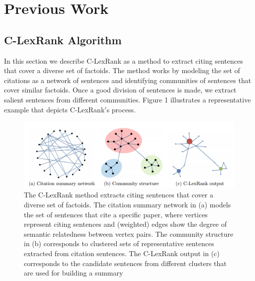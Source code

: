 \chapter{Previous Work}
\section{C-LexRank Algorithm}
In this section we describe C-LexRank as a method to extract citing sentences that cover
a diverse set of factoids. The method works by modeling the set of citations as a network
of sentences and identifying communities of sentences that cover similar factoids. Once a
good division of sentences is made, we extract salient sentences from different communities.
Figure 1 illustrates a representative example that depicts C-LexRank$'$s process.

\begin{figure}[!htbp]
\centering
\includegraphics[width=15cm]{LexRank.png}
\caption{ The C-LexRank method extracts citing sentences that cover a diverse set of factoids.
The citation summary network in (a) models the set of sentences that cite
a specific paper, where vertices represent citing sentences and (weighted) edges
show the degree of semantic relatedness between vertex pairs. The community
structure in (b) corresponds to clustered sets of representative sentences extracted
from citation sentences. The C-LexRank output in (c) corresponds to the candidate
sentences from different clusters that are used for building a summary}
\label{cLexRank}
\end{figure}

